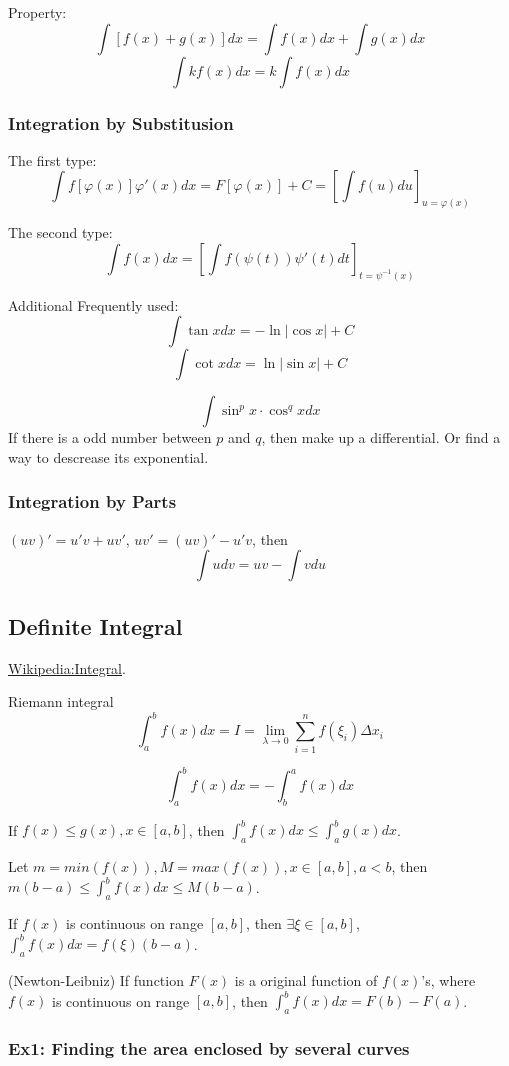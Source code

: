 Property:
$$ \int [f(x) + g(x)] dx = \int f(x) dx + \int g(x) dx $$
$$ \int kf(x) dx = k\int f(x) dx $$

  \subsubsection{Integration by Substitusion}

The first type:
$$ \int f[\varphi(x)]\varphi'(x) dx = F[\varphi(x)] + C = [\int f(u)du]_{u=\varphi(x)} $$

The second type:
$$ \int f(x) dx = [\int f(\psi(t)) \psi'(t) dt ]_{t = \psi^{-1}(x)} $$

Additional Frequently used:
$$ \int \tan x dx = -\ln |\cos x| + C$$
$$ \int \cot x dx = \ln |\sin x| + C$$

$$ \int \sin^p x \cdot \cos^q x dx $$
If there is a odd number between $p$ and $q$, then make up a differential.
Or find a way to descrease its exponential.

  \subsubsection{Integration by Parts}

$ (uv)' = u'v + uv' $, $ uv' = (uv)' - u'v $, then
$$ \int udv = uv - \int vdu $$

\subsection{Definite Integral}

 \href{https://en.wikipedia.org/wiki/Integral}
 {Wikipedia:Integral}.

Riemann integral
$$ \int_a^b f(x) dx = I = \lim_{\lambda\rightarrow 0} \sum_{i=1}^n f(\xi_i)\Delta x_i $$

$$ \int_a^b f(x) dx = - \int_b^a f(x) dx $$

If $f(x)\leq g(x), x\in [a, b]$, then $\int_a^b f(x)dx \leq \int_a^b g(x)dx$.

Let $m = min(f(x)), M = max(f(x)), x \in [a, b], a<b$, then $m(b-a) \leq \int_a^b f(x)dx \leq M(b-a)$.

If $f(x)$ is continuous on range $[a,b]$, then $\exists \xi \in [a, b]$, $\int_a^b f(x)dx = f(\xi)(b-a)$.

(Newton-Leibniz) If function $F(x)$ is a original function of $f(x)$'s, where $f(x)$
is continuous on range $[a,b]$, then $\int_a^b f(x)dx = F(b)-F(a)$.

 \subsubsection{Ex1: Finding the area enclosed by several curves}

